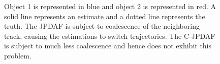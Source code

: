 \documentclass[letterpaper, 10pt, conference]{ieeeconf}
\begin{document}
\begin{figure}
\centerline{
	}
\centerline{
	}
\centerline{
	}
\caption{Object 1 is represented in blue and object 2 is represented in red. A solid line represents an estimate and a dotted line represents the truth. The JPDAF is subject to coalescence of the neighboring track, causing the estimations to switch trajectories. The C-JPDAF is subject to much less coalescence and hence does not exhibit this problem.}
\label{AllAlgorithms}
\end{figure}
\end{document}
